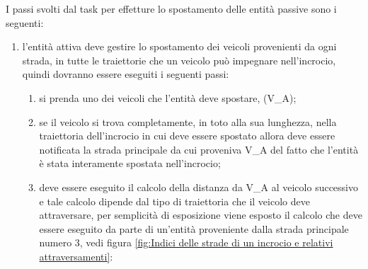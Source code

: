 I passi svolti dal task per effetture lo spostamento delle entità passive sono i seguenti:
\begin{enumerate}
\item l'entità attiva deve gestire lo spostamento dei veicoli provenienti da ogni strada, in tutte le traiettorie che un veicolo può impegnare nell'incrocio, quindi dovranno essere eseguiti i seguenti passi:
\begin{enumerate}
\item si prenda uno dei veicoli che l'entità deve spostare, (V\_A);
\item se il veicolo si trova completamente, in toto alla sua lunghezza, nella traiettoria dell'incrocio in cui deve essere spostato allora deve essere notificata la strada principale da cui proveniva V\_A del fatto che l'entità è stata interamente spostata nell'incrocio;
\item deve essere eseguito il calcolo della distanza da V\_A al veicolo successivo e tale calcolo dipende dal tipo di traiettoria che il veicolo deve attraversare, per semplicità di esposizione viene esposto il calcolo che deve essere eseguito da parte di un'entità proveniente dalla strada principale numero 3, vedi figura \ref{fig:Indici delle strade di un incrocio e relativi attraversamenti}:
\begin{itemize}

\end{itemize}
\end{enumerate}
\end{enumerate}
